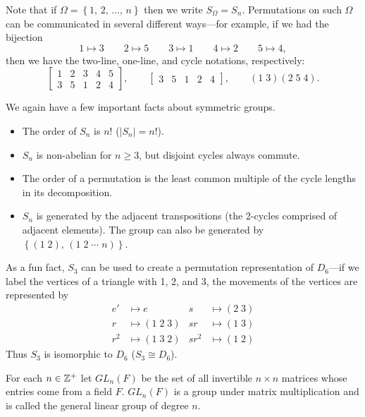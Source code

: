 \documentclass[../m171main.tex]{subfiles}
\begin{document}
Note that if $\Omega = \left\{ 1, \, 2, \, \ldots, \, n \right\}$ then we write $S_\Omega = S_n$.
Permutations on such $\Omega$ can be communicated in several different ways---for example, if we had the bijection
\[ 1 \mapsto 3 \qquad 2 \mapsto 5 \qquad 3 \mapsto 1 \qquad 4 \mapsto 2 \qquad 5 \mapsto 4, \]
then we have the two-line, one-line, and cycle notations, respectively:
\[ \begin{bmatrix} 1 & 2 & 3 & 4 & 5 \\ 3 & 5 & 1 & 2 & 4 \end{bmatrix}, \qquad \begin{bmatrix} 3 & 5 & 1 & 2 & 4 \end{bmatrix}, \qquad (1 \; 3)(2 \; 5 \; 4). \]



We again have a few important facts about symmetric groups.
\begin{itemize}
    \item The order of $S_n$ is $n!$ ($|S_n| = n!$).
    \item $S_n$ is non-abelian for $n \geq 3$, but disjoint cycles always commute.
    \item The order of a permutation is the least common multiple of the cycle lengths in its decomposition.
    \item $S_n$ is generated by the adjacent transpositions (the 2-cycles comprised of adjacent elements).
    The group can also be generated by $\left\{ (1 \; 2), \, (1 \; 2 \; \cdots \; n) \right\}$.
\end{itemize}
As a fun fact, $S_3$ can be used to create a permutation representation of $D_6$---if we label the vertices of a triangle with 1, 2, and 3, the movements of the vertices are represented by
\begin{align*}
    e' &\mapsto e & s &\mapsto (2 \; 3) \\
    r &\mapsto (1 \; 2 \; 3) & sr &\mapsto (1 \; 3) \\
    r^2 &\mapsto (1 \; 3 \; 2) & sr^2 &\mapsto (1 \; 2)
\end{align*}
Thus $S_3$ is isomorphic to $D_6$ ($S_3 \cong D_6$).

\begin{definition}
    For each $n \in \mathbb{Z}^+$ let $GL_n(F)$ be the set of all invertible $n \times n$ matrices whose entries come from a field $F$.
    $GL_n(F)$ is a group under matrix multiplication and is called the general linear group of degree $n$.
\end{definition}
\end{document}
